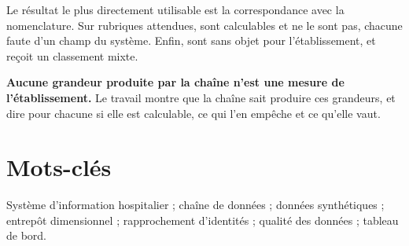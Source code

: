 Le résultat le plus directement utilisable est la correspondance avec la nomenclature. Sur
 rubriques attendues,  sont calculables
et  ne le sont pas, chacune faute d'un champ du système. Enfin,
 sont sans objet pour l'établissement, et
 reçoit un classement mixte.

\textbf{Aucune grandeur produite par la chaîne n'est une mesure de l'établissement.} Le travail
montre que la chaîne sait produire ces grandeurs, et dire pour chacune si elle est calculable, ce
qui l'en empêche et ce qu'elle vaut.

\section*{Mots-clés}

Système d'information hospitalier ; chaîne de données ; données synthétiques ; entrepôt
dimensionnel ; rapprochement d'identités ; qualité des données ; tableau de bord.

